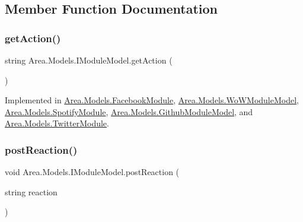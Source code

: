 \subsection{Member Function Documentation}
\mbox{\label{interfaceArea_1_1Models_1_1IModuleModel_a050d892fae9f85c6b607a7c0e30502e9}} 
\subsubsection{\texorpdfstring{get\+Action()}{getAction()}}
{\footnotesize\ttfamily string Area.\+Models.\+I\+Module\+Model.\+get\+Action (\begin{DoxyParamCaption}{ }\end{DoxyParamCaption})}



Implemented in \mbox{\hyperlink{classArea_1_1Models_1_1FacebookModule_aeb88d4de280aa76fa80c92509b7df265}{Area.\+Models.\+Facebook\+Module}}, \mbox{\hyperlink{classArea_1_1Models_1_1WoWModuleModel_a3ed39b2aeec20f1d908d9c6e43aad389}{Area.\+Models.\+Wo\+W\+Module\+Model}}, \mbox{\hyperlink{classArea_1_1Models_1_1SpotifyModule_ad506554a80eb35db2d6d9c251f38a5b7}{Area.\+Models.\+Spotify\+Module}}, \mbox{\hyperlink{classArea_1_1Models_1_1GithubModuleModel_aebec4ccbd02441daa062ce936a9f4e3d}{Area.\+Models.\+Github\+Module\+Model}}, and \mbox{\hyperlink{classArea_1_1Models_1_1TwitterModule_a80551107a68f78bf23d57948dcbe5a6d}{Area.\+Models.\+Twitter\+Module}}.

\mbox{\label{interfaceArea_1_1Models_1_1IModuleModel_af2c1a82bd894255ab2099440f4f3d6f7}} 
\subsubsection{\texorpdfstring{post\+Reaction()}{postReaction()}}
{\footnotesize\ttfamily void Area.\+Models.\+I\+Module\+Model.\+post\+Reaction (\begin{DoxyParamCaption}\item[{string}]{reaction }\end{DoxyParamCaption})}



